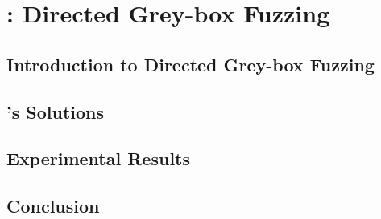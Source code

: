 
\chapter{\dFOT: Directed Grey-box Fuzzing} \label{Chapter7}

\section{Introduction to Directed Grey-box Fuzzing}

\section{\dFOT's Solutions}

\section{Experimental Results}

\section{Conclusion}
